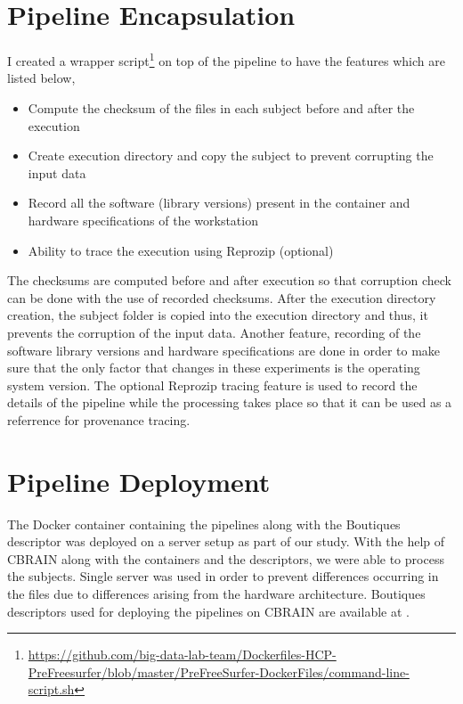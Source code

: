 \section{Pipeline Encapsulation}
I created a wrapper script\footnote{\url{https://github.com/big-data-lab-team/Dockerfiles-HCP-PreFreesurfer/blob/master/PreFreeSurfer-DockerFiles/command-line-script.sh}} on top of the pipeline to have the features which are listed below,
\begin{itemize}
  \item Compute the checksum of the files in each subject before and after the execution
  \item Create execution directory and copy the subject to prevent corrupting the input data
  \item Record all the software (library versions) present in the container and hardware specifications of the workstation
  \item Ability to trace the execution using Reprozip (optional)
\end{itemize}

The checksums are computed before and after execution so that corruption check can be done with the use of recorded checksums. After the execution directory creation, the subject folder is copied into the execution directory and thus, it prevents the corruption of the input data. Another feature, recording of the software library versions and hardware specifications are done in order to make sure that the only factor that changes in these experiments is the operating system version. The optional Reprozip tracing feature is used to record the details of the pipeline while the processing takes place so that it can be used as a referrence for provenance tracing.

\section{Pipeline Deployment}
The Docker container containing the pipelines along with the Boutiques descriptor was deployed on a server setup as part of our study. With the help of CBRAIN along with the containers and the descriptors, we were able to process the subjects. Single server was used in order to prevent differences occurring in the files due to differences arising from the hardware architecture. Boutiques descriptors used for deploying the pipelines on CBRAIN are available at \cite{HCP_descriptors}.


